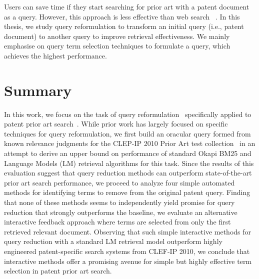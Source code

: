 Users can save time if they start searching for prior art with a patent document as a query. However, this approach is less effective than web search
~\citep{lupu2013patent}. In this thesis, we study query reformulation to transform an initial query (i.e., patent document) to another query to improve retrieval effectiveness. We mainly emphasise on query term selection techniques to formulate a query, which achieves the highest performance.


\section{Summary}
\label{sec:summary}
In this work, we focus on the task of query
reformulation~\citep{Baeza-Yates2011} specifically applied to patent
prior art
search~\citep{mahdabi2014patent,Piroi2010,xue2009transforming}. While
prior work has largely focused on specific techniques for query
reformulation, 
 we first
build an oracular query formed from known relevance judgments for the
CLEP-IP 2010 Prior Art test collection~\citep{Piroi2010} in an attempt
to derive an upper bound on performance of standard Okapi BM25 and
Language Models (LM) retrieval algorithms for this task.  Since the
results of this evaluation suggest that query reduction methods can
outperform state-of-the-art prior art search performance, 
we proceed to analyze four simple
automated methods for identifying terms to remove from the original
patent query.  Finding that none of these methods seems to
independently yield promise for query reduction that strongly
outperforms the baseline, 
we evaluate an alternative
interactive feedback approach where terms are selected from only the
first retrieved relevant document.  Observing that such simple
interactive methods for query reduction with a standard LM retrieval
model outperform highly engineered patent-specific search systems from
CLEF-IP 2010, we conclude that interactive methods offer a promising
avenue for simple but highly effective term selection in patent prior
art search.

